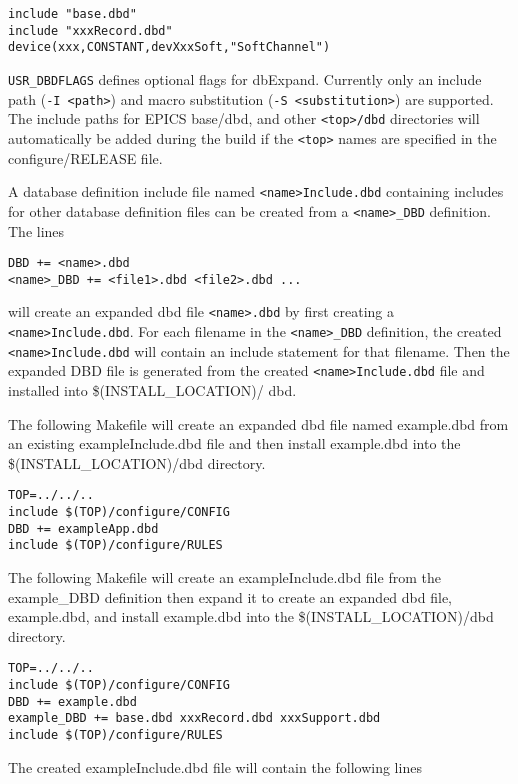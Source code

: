 \begin{verbatim}
include "base.dbd"
include "xxxRecord.dbd"
device(xxx,CONSTANT,devXxxSoft,"SoftChannel")
\end{verbatim}

\verb|USR_DBDFLAGS| defines optional flags for dbExpand. Currently only an include path (\verb|-I <path>|) and macro substitution 
(\verb|-S <substitution>|) are supported. The include paths for EPICS base/dbd, and other \verb|<top>/dbd| directories will 
automatically be added during the build if the \verb|<top>| names are specified in the configure/RELEASE file.

A database definition include file named \verb|<name>Include.dbd| containing includes for other database definition files can 
be created from a \verb|<name>_DBD| definition. The lines

\begin{verbatim}
DBD += <name>.dbd
<name>_DBD += <file1>.dbd <file2>.dbd ...
\end{verbatim}

will create an expanded dbd file \verb|<name>.dbd| by first creating a \verb|<name>Include.dbd|. For each filename in the 
\verb|<name>_DBD| definition, the created \verb|<name>Include.dbd| will contain an include statement for that filename. Then   the 
expanded DBD file is generated from the created \verb|<name>Include.dbd| file and installed into \$(INSTALL\_LOCATION)/
dbd. 

The following Makefile will create an expanded dbd file named example.dbd from an existing exampleInclude.dbd file 
and then install example.dbd into the \$(INSTALL\_LOCATION)/dbd directory.

\begin{verbatim}
TOP=../../..
include $(TOP)/configure/CONFIG
DBD += exampleApp.dbd
include $(TOP)/configure/RULES
\end{verbatim}

The following Makefile will create an exampleInclude.dbd file from the example\_DBD definition then expand it to create 
an expanded dbd file, example.dbd, and install example.dbd into the \$(INSTALL\_LOCATION)/dbd directory.

\begin{verbatim}
TOP=../../..
include $(TOP)/configure/CONFIG
DBD += example.dbd
example_DBD += base.dbd xxxRecord.dbd xxxSupport.dbd
include $(TOP)/configure/RULES
\end{verbatim}

The created exampleInclude.dbd file will contain the following lines

